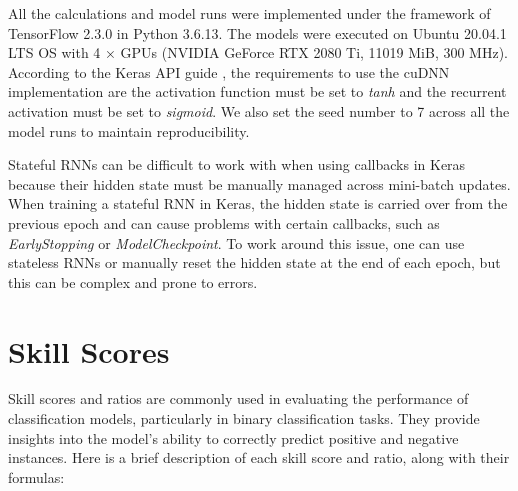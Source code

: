 All the calculations and model runs were implemented under the framework of TensorFlow 2.3.0 \citep{singh_2020} in Python 3.6.13. 
The models were executed on Ubuntu 20.04.1 LTS OS with 4 × GPUs (NVIDIA GeForce RTX 2080 Ti, 11019 MiB, 300 MHz).
According to the Keras API guide \citep{keras2017}, the requirements to use the cuDNN implementation are the activation function must be set to \textit{tanh} and the recurrent activation must be set to \textit{sigmoid}.
We also set the seed number to 7 across all the model runs to maintain reproducibility.

Stateful RNNs can be difficult to work with when using callbacks in Keras because their hidden state must be manually managed across mini-batch updates. When training a stateful RNN in Keras, the hidden state is carried over from the previous epoch and can cause problems with certain callbacks, such as \textit{EarlyStopping} or \textit{ModelCheckpoint}. To work around this issue, one can use stateless RNNs or manually reset the hidden state at the end of each epoch, but this can be complex and prone to errors.
\section{Skill Scores}
\label{skillscores_appendix}
Skill scores and ratios are commonly used in evaluating the performance of classification models, particularly in binary classification tasks. They provide insights into the model's ability to correctly predict positive and negative instances. Here is a brief description of each skill score and ratio, along with their formulas:

